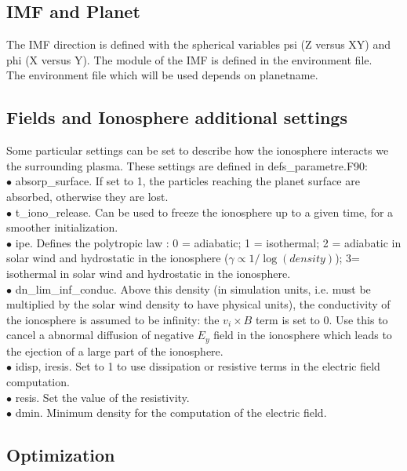 \documentclass{article}
\begin{document}
\subsection{IMF and Planet}
The IMF direction is defined with the spherical variables {\sf psi} (Z versus XY) and {\sf phi} (X versus Y). The module of the IMF is defined in the environment file.\\

The environment file which will be used depends on {\sf planetname}.

\subsection{Fields and Ionosphere additional settings}

Some particular settings can be set to describe how the ionosphere interacts we the surrounding plasma. These settings are defined in {\sf defs\_parametre.F90}:\\
$\bullet$ {\sf absorp\_surface}. If set to 1, the particles reaching the planet surface are absorbed, otherwise they are lost.\\
$\bullet$ {\sf t\_iono\_release}. Can be used to freeze the ionosphere up to a given time, for a smoother initialization.\\
$\bullet$ {\sf ipe}. Defines the polytropic law : 0 = adiabatic; 1 = isothermal; 2 = adiabatic in solar wind and hydrostatic in the ionosphere ($\gamma\propto 1/\log(density)$); 3= isothermal in solar wind and hydrostatic in the ionosphere.\\
$\bullet$ {\sf dn\_lim\_inf\_conduc}. Above this density (in simulation units, i.e. must be multiplied by the solar wind density to have physical units), the conductivity of the ionosphere is assumed to be infinity: the $v_i\times B$ term is set to $0$. Use this to cancel a abnormal diffusion of negative $E_y$ field in the ionosphere which leads to the ejection of a large part of the ionosphere.\\
$\bullet$ {\sf idisp, iresis}. Set to 1 to use dissipation or resistive terms in the electric field computation.\\
$\bullet$ {\sf resis}. Set the value of the resistivity.\\
$\bullet$ {\sf dmin}. Minimum density for the computation of the electric field.

\subsection{Optimization}
\end{document}
